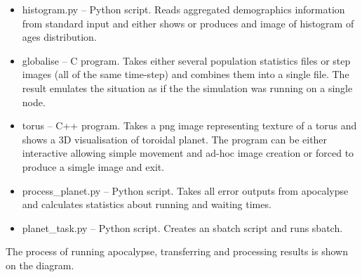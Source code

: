 \documentclass[a4paper]{article}
\begin{document}
\begin{itemize}
\item histogram.py -- Python script. Reads aggregated demographics information from standard input and either shows or produces and image of histogram of ages distribution.
\item globalise -- C program. Takes either several population statistics files or step images (all of the same time-step) and combines them into a single file.
    The result emulates the situation as if the the simulation was running on a single node.
\item torus -- C++ program. Takes a png image representing texture of a torus and shows a 3D visualisation of toroidal planet.
    The program can be either interactive allowing simple movement and ad-hoc image creation or forced to produce a simgle image and exit.
\item process\_planet.py -- Python script. Takes all error outputs from apocalypse and calculates statistics about running and waiting times.
\item planet\_task.py -- Python script. Creates an sbatch script and runs sbatch. 
\end{itemize}

The process of running apocalypse, transferring and processing results is shown on the diagram.
\end{document}
